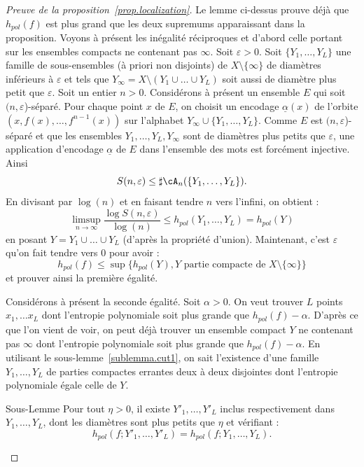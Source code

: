 \begin{proof}[Preuve de la proposition~\ref{prop.localization}]
Le lemme ci-dessus prouve déjà que $h_{pol}(f)$ est plus grand que les deux supremums apparaissant dans la proposition. Voyons à présent les inégalité réciproques et d'abord celle portant sur les ensembles compacts ne contenant pas $\infty$. Soit $\varepsilon >0$. Soit $\{Y_1, \dots, Y_L\}$ une famille de sous-ensembles (à priori non disjoints) de $X \setminus \{\infty\}$ de diamètres inférieurs à $\varepsilon$ et tels que $Y_\infty = X \setminus (Y_1 \cup \dots \cup Y_L)$ soit aussi de diamètre plus petit que $\varepsilon$. Soit un entier $n >0$. Considérons à présent un ensemble $E$ qui soit $(n,\varepsilon$)-séparé. Pour chaque point $x$ de $E$, on choisit un encodage $\underline{\alpha}(x)$ de l'orbite $(x, f(x), \dots, f^{n-1}(x))$ sur l'alphabet $Y_\infty \cup \{Y_1, \dots, Y_L\}$. Comme $E$ est $(n,\varepsilon$)-séparé et que les ensembles $Y_1, \dots, Y_L, Y_\infty$ sont de diamètres plus petits que $\varepsilon$, une application d'encodage $\underline{\alpha}$ de $E$ dans l'ensemble des mots est forcément injective. Ainsi
\[
S(n,\varepsilon) \leq \sharp \cA_n(\{Y_1, \dots, Y_L\}).
\]
En divisant par $\log(n)$ et en faisant tendre $n$ vers l'infini, on obtient :
\[
\limsup_{n \to \infty} \frac{\log S(n,\varepsilon)}{\log (n)} \leq h_{pol}(Y_{1}, \dots, Y_{L}) = h_{pol}(Y)
\]
en posant $Y=Y_{1} \cup \dots \cup Y_{L}$ (d'après la propriété d'union). Maintenant, c'est $\varepsilon$ qu'on fait tendre vers $0$ pour avoir :
\[
h_{pol}(f) \leq \sup \{ h_{pol}(Y), Y \text{ partie compacte de } X\setminus \{\infty\} \}
\]
et prouver ainsi la première égalité.

Considérons à présent la seconde égalité. Soit $\alpha>0$. On veut trouver $L$ points $x_1, \dots x_L$ dont l'entropie polynomiale soit plus grande que $h_{pol}(f)-\alpha$. D'après ce que l'on vient de voir, on peut déjà trouver un ensemble compact $Y$ ne contenant pas $\infty$ dont l'entropie polynomiale soit plus grande que $h_{pol}(f)-\alpha$. En utilisant le sous-lemme~\ref{sublemma.cut1}, on sait l'existence d'une famille $Y_1, \dots, Y_L$ de parties compactes errantes deux à deux disjointes dont l'entropie polynomiale égale celle de $Y$.

\begin{enonce}{Sous-Lemme}\label{sublemma.cut2}
Pour tout $\eta>0$, il existe $Y'_1, \dots, Y'_L$ inclus respectivement dans $Y_1, \dots, Y_L$, dont les diamètres sont plus petits que $\eta$ et vérifiant :
\[
h_{pol}(f; Y'_{1}, \dots, Y'_{L})= h_{pol}(f; Y_{1}, \dots, Y_{L}).
\]
\end{enonce}


\end{proof}
